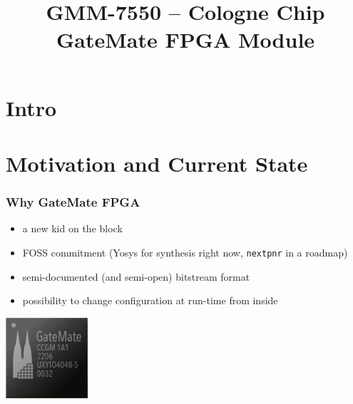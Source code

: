 
\usepackage{tikz}

\title{GMM-7550 -- Cologne Chip GateMate FPGA Module}
\subtitle{}




\begin{frame}
  \titlepage
\end{frame}

\section{Intro}



\frame{\tableofcontents}

\section{Motivation and Current State}

\begin{frame}
  \frametitle{Why GateMate FPGA}

  \begin{itemize}
    \item a new kid on the block
    \item FOSS commitment (Yosys for synthesis right now, \texttt{nextpnr}
    in a roadmap)
    \item semi-documented (and semi-open) bitstream format
    \item possibility to change configuration at run-time from inside
  \end{itemize}

  \begin{center}
    \includegraphics[height=3cm]{CCGM1A1_front.jpg}
  \end{center}

\end{frame}

